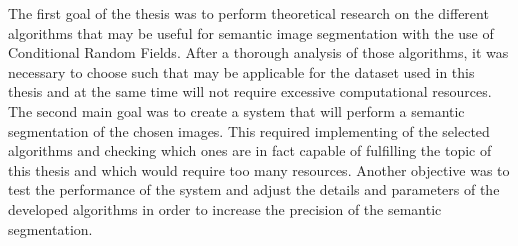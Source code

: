 The first goal of the thesis was to perform theoretical research on the different algorithms that may be useful for semantic image segmentation with the use of Conditional Random Fields. After a thorough analysis of those algorithms, it was necessary to choose such that may be applicable for the dataset used in this thesis and at the same time will not require excessive computational resources. The second main goal was to create a system that will perform a semantic segmentation of the chosen images. This required implementing of the selected algorithms and checking which ones are in fact capable of fulfilling the topic of this thesis and which would require too many resources. Another objective was to test the performance of the system and adjust the details and parameters of the developed algorithms in order to increase the precision of the semantic segmentation. 